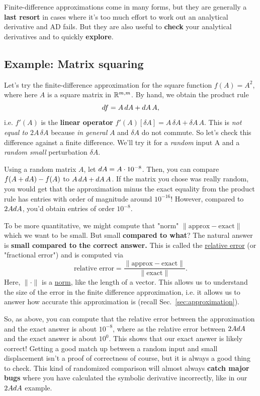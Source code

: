 Finite-difference approximations come in many forms, but they are generally a \textbf{last resort} in cases where it's too much effort to work out an analytical derivative and AD fails.  But they are also useful to \textbf{check} your analytical derivatives and to quickly \textbf{explore}.

\subsection{Example: Matrix squaring}

Let's try the finite-difference approximation for the square function $f(A) = A^2$, where here $A$ is a square matrix in $\mathbb R^{m,m}$. By hand, we obtain the product rule 
\[
d f = A \,d A + d A \, A,
\]
i.e. $f'(A)$ is the \textbf{linear operator} $\boxed{f'(A)[\delta A] = A \,\delta A + \delta A \,A.}$ This is \textit{not equal to} $2A \,\delta A$ because \textit{in general} $A$ and $\delta A$ do not commute. So let's check this difference against a finite difference.  We'll try it for a \textit{random} input A and a \textit{random small} perturbation $\delta A$.

Using a random matrix $A$, let $d A = A \cdot 10^{-8}$. Then, you can compare $f(A+d A) - f(A)$ to $A \,d A + d A \, A$. If the matrix you chose was really random, you would get that the approximation minus the exact equality from the product rule has entries with order of magnitude around $10^{-16}!$ However, compared to $2A d A$, you'd obtain entries of order $10^{-8}$.

To be more quantitative, we might compute that "norm" $\lVert \text{approx} - \text{exact} \rVert$ which we want to be small. But small \textbf{compared to what}? The natural answer is \textbf{small compared to the correct answer.} This is called the \href{https://en.wikipedia.org/wiki/Approximation_error}{relative error} (or "fractional error") and is computed via 
\[
\text{relative error} = \frac{\lVert \text{approx} - \text{exact} \rVert}{\lVert \text{exact} \rVert}.
\]
Here, $\lVert \cdot \rVert$ is a \href{https://en.wikipedia.org/wiki/Norm_(mathematics)}{norm}, like the length of a vector. This allows us to understand the size of the error in the finite difference approximation, i.e. it allows us to answer how accurate this approximation is (recall Sec.~\ref{sec:approximation}).

So, as above, you can compute that the relative error between the approximation and the exact answer is about $10^{-8}$, where as the relative error between $2A d A$ and the exact answer is about $10^{0}$. This shows that our exact answer is likely correct! Getting a good match up between a random input and small displacement isn't a proof of correctness of course, but it is always a good thing to check. This kind of randomized comparison will almost always \textbf{catch major bugs} where you have calculated the symbolic derivative incorrectly, like in our $2A d A$ example.

